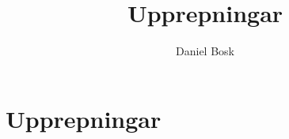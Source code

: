 \documentclass[a4paper,10pt,oneside,openright,
               oldfontcommands]{memoir}
\begin{document}
\title{%
  Upprepningar
}
\author{Daniel Bosk}

\maketitle

\begin{abstract}
  
\end{abstract}

\clearpage

\tableofcontents*

\chapter{Upprepningar}



\appendix


\printbibliography
\end{document}
